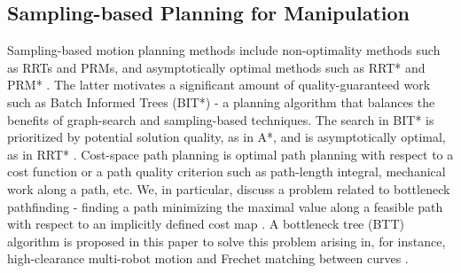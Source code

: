 \documentclass[conference]{IEEEtran}
\begin{document}
\subsection{Sampling-based Planning for Manipulation}
Sampling-based motion planning methods include non-optimality methods such as RRTs \cite{} and PRMs\cite{}, and asymptotically optimal methods such as RRT* and PRM* \cite{}.
The latter motivates a significant amount of quality-guaranteed work such as Batch Informed Trees (BIT*) \cite{b14} - a planning algorithm that balances the benefits of graph-search and sampling-based techniques. The search in BIT* is prioritized by potential solution quality, as in A*, and is asymptotically optimal, as in RRT* \cite{b16}. 
Cost-space path planning is optimal path planning with respect to a cost function or a path quality criterion such as path-length integral, mechanical work along a path, etc.\cite{b17} 
We, in particular, discuss a problem related to bottleneck pathfinding - finding a path minimizing the maximal value along a feasible path with respect to an implicitly defined cost map \cite{}. A bottleneck tree (BTT) algorithm is proposed in this paper to solve this problem arising in, for instance, high-clearance multi-robot motion \cite{} and Frechet matching between curves \cite{}.
\end{document}
